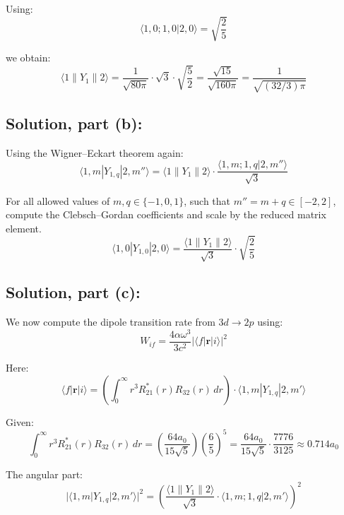 \documentclass[12pt]{article}
\begin{document}
        Using:
        \[
            \langle 1, 0; 1, 0 | 2, 0 \rangle = \sqrt{\frac{2}{5}}
        \]
        
        we obtain:
        \[
            \langle 1 \parallel Y_1 \parallel 2 \rangle 
            = \frac{1}{\sqrt{80\pi}} \cdot \sqrt{3} \cdot \sqrt{\frac{5}{2}} 
            = \frac{\sqrt{15}}{\sqrt{160\pi}} 
            = \frac{1}{\sqrt{(32/3)\pi}}
        \]

    \subsection{Solution, part (b):}
        Using the Wigner–Eckart theorem again:
        \[
            \langle 1, m | Y_{1, q} | 2, m'' \rangle = 
            \langle 1 \parallel Y_1 \parallel 2 \rangle \cdot 
            \frac{\langle 1, m; 1, q | 2, m'' \rangle}{\sqrt{3}}
        \]
        
        For all allowed values of \( m, q \in \{-1, 0, 1\} \), such that \( m'' = m + q \in [-2, 2] \), compute the Clebsch–Gordan coefficients and scale by the reduced matrix element.
        \[
            \langle 1, 0 | Y_{1, 0} | 2, 0 \rangle 
            = \frac{\langle 1 \parallel Y_1 \parallel 2 \rangle}{\sqrt{3}} \cdot \sqrt{\frac{2}{5}}
        \]

    \subsection{Solution, part (c):}
        We now compute the dipole transition rate from \( 3d \rightarrow 2p \) using:
        \[
            W_{if} = \frac{4 \alpha \omega^3}{3c^2} \left| \langle f | \mathbf{r} | i \rangle \right|^2
        \]
        
        Here:
        \[
            \langle f | \mathbf{r} | i \rangle = 
            \left( \int_0^\infty r^3 R_{21}^*(r) R_{32}(r)\, dr \right) 
            \cdot \langle 1, m | Y_{1, q} | 2, m' \rangle
        \]
        
        Given:
        \[
            \int_0^\infty r^3 R_{21}^*(r) R_{32}(r)\, dr = 
            \left( \frac{64 a_0}{15 \sqrt{5}} \right) \left( \frac{6}{5} \right)^5
            = \frac{64 a_0}{15 \sqrt{5}} \cdot \frac{7776}{3125} \approx 0.714 a_0
        \]
        
        The angular part:
        \[
            |\langle 1, m | Y_{1, q} | 2, m' \rangle|^2 
            = \left( \frac{\langle 1 \parallel Y_1 \parallel 2 \rangle}{\sqrt{3}} 
            \cdot \langle 1, m; 1, q | 2, m' \rangle \right)^2
        \]
        
\end{document}
